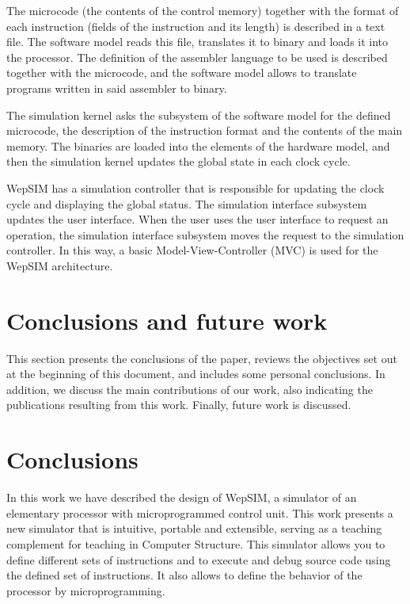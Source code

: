 The microcode (the contents of the control memory) together with the format of each instruction (fields of the instruction and its length) is described in a text file. The software model reads this file, translates it to binary and loads it into the processor. The definition of the assembler language to be used is described together with the microcode, and the software model allows to translate programs written in said assembler to binary.


The simulation kernel asks the subsystem of the software model for the defined microcode, the description of the instruction format and the contents of the main memory. The binaries are loaded into the elements of the hardware model, and then the simulation kernel updates the global state in each clock cycle.

WepSIM has a simulation controller that is responsible for updating the clock cycle and displaying the global status. The simulation interface subsystem updates the user interface. When the user uses the user interface to request an operation, the simulation interface subsystem moves the request to the simulation controller. In this way, a basic Model-View-Controller (MVC) is used for the WepSIM architecture.

\section{Conclusions and future work}

This section presents the conclusions of the paper, reviews the objectives set out at the beginning of this document, and includes some personal conclusions. In addition, we discuss the main contributions of our work, also indicating the publications resulting from this work. Finally, future work is discussed.

\section{Conclusions}

In this work we have described the design of WepSIM, a simulator of an elementary processor with microprogrammed control unit. This work presents a new simulator that is intuitive, portable and extensible, serving as a teaching complement for teaching in Computer Structure. This simulator allows you to define different sets of instructions and to execute and debug source code using the defined set of instructions. It also allows to define the behavior of the processor by microprogramming.

